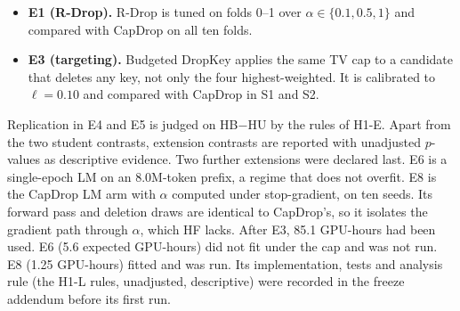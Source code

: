 \begin{itemize}
trained on 919 pairs for ten epochs. The arms are the reference, the S1-selected Relaxed Attention, HU and HB, with ten
seeds. The 339 development pairs serve as a sealed one-shot test, because the official test labels are not public.
Claim-only inputs and deletion of the gold rationale sentences give the diagnostics.
\item \textbf{E1 (R-Drop).} R-Drop \citep{liang2021rdrop} is tuned on folds 0--1 over $\alpha\in\{0.1,0.5,1\}$ and compared
with CapDrop on all ten folds.
\item \textbf{E3 (targeting).} Budgeted DropKey applies the same TV cap to a candidate that deletes any key, not
only the four highest-weighted. It is calibrated to $\ell=0.10$ and compared with CapDrop in S1 and S2.
\end{itemize}
Replication in E4 and E5 is judged on HB$-$HU by the rules of H1-E. Apart from the two student contrasts, extension
contrasts are reported with unadjusted $p$-values as descriptive evidence.
Two further extensions were declared last. E6 is a single-epoch LM on an 8.0M-token prefix, a regime that does not overfit.
E8 is the CapDrop LM arm with $\alpha$ computed under stop-gradient, on ten seeds. Its forward pass and deletion
draws are identical to CapDrop's, so it isolates the gradient path through $\alpha$, which HF lacks. After E3, 85.1 GPU-hours had been used.
E6 (5.6 expected GPU-hours) did not fit under the cap and was not run. E8 (1.25 GPU-hours) fitted and was run. Its implementation, tests and
analysis rule (the H1-L rules, unadjusted, descriptive) were recorded in the freeze addendum before its first run.
